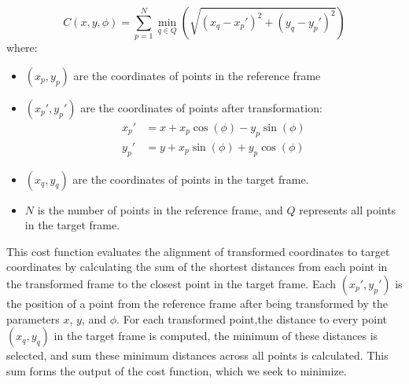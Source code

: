 \documentclass{micro-econ-thesis}
\begin{document}
\begin{equation}
	C(x, y, \phi) = \sum_{p=1}^{N} \min_{q \in Q} \left( \sqrt{(x_q - x_p')^2 + (y_q - y_p')^2} \right)
	\label{eq:cost_func}
\end{equation}
where:
\begin{itemize}
	\item $ (x_p, y_p) $ are the coordinates of points in the reference frame
	\item $(x_p', y_p')$ are the coordinates of points after transformation:
	\begin{align*}
		x_p' &= x + x_p \cos(\phi) - y_p \sin(\phi) \\
		y_p' &= y + x_p \sin(\phi) + y_p \cos(\phi)
	\end{align*}
	\item $(x_q, y_q)$ are the coordinates of points in the target frame.
	\item $N$ is the number of points in the reference frame, and $Q$ represents all points in the target frame.
\end{itemize}

This cost function evaluates the alignment of transformed coordinates to target coordinates by calculating the sum of the shortest distances from each point in the transformed frame to the closest point in the target frame. Each $(x_p', y_p')$ is the position of a point from the reference frame after being transformed by the parameters $x$, $y$, and $\phi$. For each transformed point,the distance to every point $(x_q, y_q)$ in the target frame is computed, the minimum of these distances is selected, and sum these minimum distances across all points is calculated. This sum forms the output of the cost function, which we seek to minimize.
\end{document}
